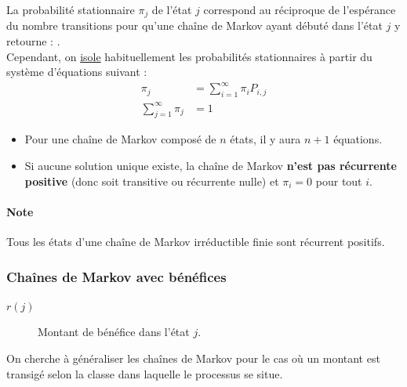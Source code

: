 \documentclass[10pt, french]{article}
\begin{document}
\begin{multicols*}{2}
\begin{definitionNOHFILLprop}
La probabilité stationnaire $\pi_{j}$ de l'état $j$ correspond au réciproque de l'espérance du nombre transitions pour qu'une chaîne de Markov ayant débuté dans l'état $j$ y retourne : .\\

Cependant, on \underline{isole} habituellement les probabilités stationnaires à partir du système d'équations suivant : 
\begin{align*}
	\pi_{j}
	&=	\sum_{i = 1}^{\infty} \pi_{i} P_{i, j}	\\
	\sum_{j = 1}^{\infty} \pi_{j}
	&=	1
\end{align*}

\begin{itemize}
	\item	Pour une chaîne de Markov composé de $n$ états, il y aura $n + 1$ équations.
	\item	Si aucune solution unique existe, la chaîne de Markov \textbf{n'est pas récurrente positive} (donc soit transitive ou récurrente nulle) et $\pi_{i} = 0$ pour tout $i$.
\end{itemize}
\end{definitionNOHFILLprop}

\paragraph{Note}	Tous les états d'une chaîne de Markov irréductible finie sont récurrent positifs.



\subsubsection{Chaînes de Markov avec bénéfices}
\begin{distributions}[Notation]
\begin{description}
	\item[$r(j)$]	Montant de bénéfice dans l'état $j$.
\end{description}
\end{distributions}

\begin{rappel_enhanced}[Contexte]
On cherche à généraliser les chaînes de Markov pour le cas où un montant est transigé selon la classe dans laquelle le processus se situe.\\


\end{rappel_enhanced}
\end{multicols*}
\end{document}

